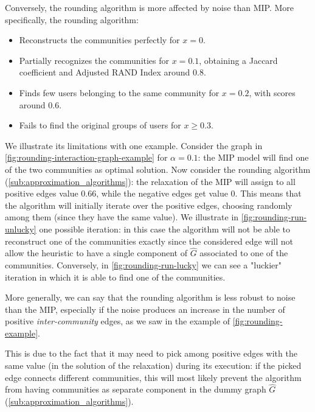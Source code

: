 Conversely, the rounding algorithm is more affected by noise than MIP. More
specifically, the rounding algorithm:
\begin{itemize}
	\item Reconstructs the communities perfectly for $x = 0$.
	\item Partially recognizes the communities for $x= 0.1$, obtaining a
	      Jaccard coefficient and Adjusted RAND Index around $0.8$.
	\item Finds few users belonging to the same community for $x = 0.2$, with
	      scores around $0.6$.
	\item Fails to find the original groups of users for $x \geq 0.3$.
\end{itemize}
We illustrate its limitations with one example. Consider the graph in
\autoref{fig:rounding-interaction-graph-example} for $\alpha = 0.1$:
the MIP model will find one of the two communities as optimal solution.
Now consider the rounding algorithm (\autoref{sub:approximation_algorithms}):
the relaxation of the MIP will assign to all positive edges value
$0.66$, while the negative edges get value $0$. This means that the algorithm
will initially iterate over the positive edges, choosing randomly among them (since they have the same value).
We illustrate in \autoref{fig:rounding-run-unlucky} one possible iteration: in
this case the algorithm will not be able to reconstruct one of the communities
exactly since the considered edge will not allow the heuristic to have a single component of
$\hat{G}$ associated to one of the communities.
Conversely, in \autoref{fig:rounding-run-lucky} we can see a "luckier"
iteration in which it is able to find one of the communities.

More generally, we can say that the rounding algorithm is less robust to noise
than the MIP, especially if the noise produces an increase in the number of
positive \emph{inter-community} edges, as we saw in the example of
\autoref{fig:rounding-example}.

This is due to the fact that it may need to pick among positive edges with the
same value (in the solution of the relaxation) during its execution: if the picked edge connects different communities, this will most
likely prevent the algorithm from having communities as separate component in
the dummy graph $\hat{G}$ (\autoref{sub:approximation_algorithms}).


